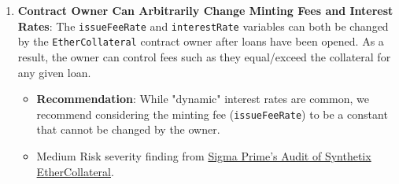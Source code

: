 \begin{enumerate}
\item\textbf{Contract Owner Can Arbitrarily Change Minting Fees and Interest Rates}: The \verb|issueFeeRate| and \verb|interestRate| variables can both be changed by the \verb|EtherCollateral| contract owner after loans have been opened. As a result, the owner can control fees such as they equal/exceed the collateral for any given loan.
	\begin{itemize}
	\item\textbf{Recommendation}: While "dynamic" interest rates are common, we recommend considering the minting fee (\verb|issueFeeRate|) to be a constant that cannot be changed by the owner.
	\item Medium Risk severity finding from \href{https://github.com/sigp/public-audits/blob/master/synthetix/ethercollateral/review.pdf}{Sigma Prime's Audit of Synthetix EtherCollateral}.
	\end{itemize}


\end{enumerate}
